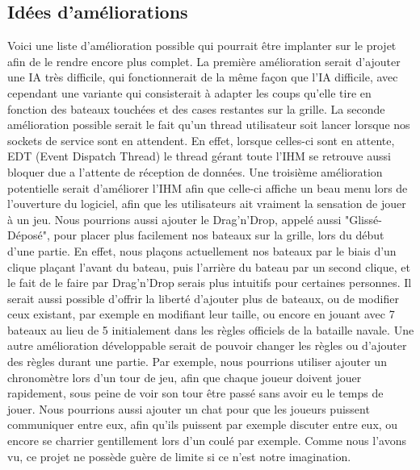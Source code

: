 \subsection{Idées d'améliorations}
	Voici une liste d'amélioration possible qui pourrait être implanter sur le projet afin de le rendre encore plus complet.\newline
	La première amélioration serait d'ajouter une IA très difficile, qui fonctionnerait de la même façon que l'IA difficile, avec cependant une variante qui consisterait à adapter les coups qu'elle tire en fonction des bateaux touchées et des cases restantes sur la grille.\newline
	La seconde amélioration possible serait le fait qu'un thread utilisateur soit lancer lorsque nos sockets de service sont en attendent. En effet, lorsque celles-ci sont en attente, EDT (Event Dispatch Thread) le thread gérant toute l'IHM se retrouve aussi bloquer due a l'attente de réception de données.\newline
	Une troisième amélioration potentielle serait d'améliorer l'IHM afin que celle-ci affiche un beau menu lors de l'ouverture du logiciel, afin que les utilisateurs ait vraiment la sensation de jouer à un jeu.\newline
	Nous pourrions aussi ajouter le Drag'n'Drop, appelé aussi "Glissé-Déposé", pour placer plus facilement nos bateaux sur la grille, lors du début d'une partie. En effet, nous plaçons actuellement nos bateaux par le biais d'un clique plaçant l'avant du bateau, puis l'arrière du bateau par un second clique, et le fait de le faire par Drag'n'Drop serais plus intuitifs pour certaines personnes.\newline
	Il serait aussi possible d'offrir la liberté d'ajouter plus de bateaux, ou de modifier ceux existant, par exemple en modifiant leur taille, ou encore en jouant avec 7 bateaux au lieu de 5 initialement dans les règles officiels de la bataille navale.\newline
	Une autre amélioration développable serait de pouvoir changer les règles ou d'ajouter des règles durant une partie. Par exemple, nous pourrions utiliser ajouter un chronomètre lors d'un tour de jeu, afin que chaque joueur doivent jouer rapidement, sous peine de voir son tour être passé sans avoir eu le temps de jouer.
	Nous pourrions aussi ajouter un chat pour que les joueurs puissent communiquer entre eux, afin qu'ils puissent par exemple discuter entre eux, ou encore se charrier gentillement lors d'un coulé par exemple.\newline
	Comme nous l'avons vu, ce projet ne possède guère de limite si ce n'est notre imagination.\newline

